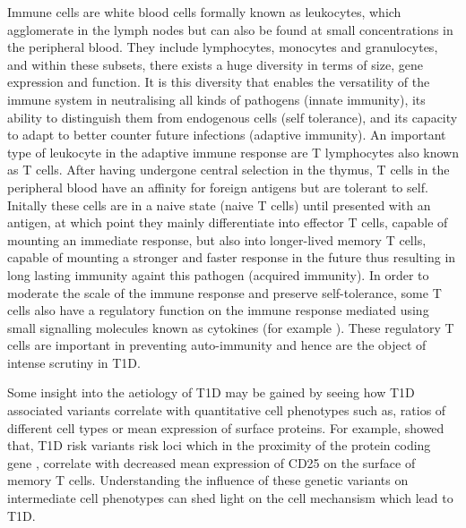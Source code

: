 Immune cells are white blood cells formally known as leukocytes, which agglomerate in the lymph nodes but can also be found at small concentrations in the peripheral blood.
They include lymphocytes, monocytes and granulocytes, and within these subsets, there exists a huge diversity in terms of size, gene expression and function.
It is this diversity that enables the versatility of the immune system in neutralising all kinds of pathogens (innate immunity),
its ability to distinguish them from endogenous cells (self tolerance),
and its capacity to adapt to better counter future infections (adaptive immunity).
An important type of leukocyte in the adaptive immune response are T lymphocytes also known as T cells.
After having undergone central selection in the thymus,
T cells in the peripheral blood have an affinity for foreign antigens but are tolerant to self.
Initally these cells are in a naive state (naive T cells) until presented with an antigen,
at which point they mainly differentiate into effector T cells, capable of mounting an immediate response,
but also into longer-lived memory T cells, capable of mounting a stronger and faster response in the future thus
resulting in long lasting immunity againt this pathogen (acquired immunity).
In order to moderate the scale of the immune response and preserve self-tolerance, some T cells also have a regulatory function on the immune response
mediated using small signalling molecules known as cytokines (for example ).
These regulatory T cells are important in preventing auto-immunity and hence are the object of intense scrutiny in T1D.

Some insight into the aetiology of T1D may be gained by seeing how T1D associated variants correlate with quantitative cell phenotypes such as, 
ratios of different cell types or mean expression of surface proteins.
For example, \citet{Dendrou:2009dv} showed that, T1D risk variants risk loci which in the proximity of the protein coding gene ,
correlate with decreased mean expression of CD25 on the surface of memory T cells.
Understanding the influence of these genetic variants on intermediate cell phenotypes can shed light on the cell mechansism which lead to T1D.


